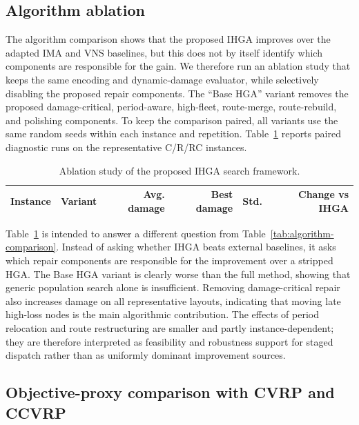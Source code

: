 ﻿\documentclass[preprint,12pt,authoryear]{elsarticle}
\begin{document}
\subsection{Algorithm ablation}
\label{subsec:operator-ablation}

The algorithm comparison shows that the proposed IHGA improves over the adapted IMA and VNS baselines, but this does not by itself identify which components are responsible for the gain. We therefore run an ablation study that keeps the same encoding and dynamic-damage evaluator, while selectively disabling the proposed repair components. The ``Base HGA'' variant removes the proposed damage-critical, period-aware, high-fleet, route-merge, route-rebuild, and polishing components. To keep the comparison paired, all variants use the same random seeds within each instance and repetition. Table~\ref{tab:operator-ablation} reports paired diagnostic runs on the representative C/R/RC instances.

\begin{table}[H]
\centering
\caption{Ablation study of the proposed IHGA search framework.}
\label{tab:operator-ablation}
\scriptsize
\begin{tabular}{llrrrr}
\toprule
Instance & Variant & Avg. damage & Best damage & Std. & Change vs IHGA \\
\midrule

\end{tabular}
\end{table}

Table~\ref{tab:operator-ablation} is intended to answer a different question from Table~\ref{tab:algorithm-comparison}. Instead of asking whether IHGA beats external baselines, it asks which repair components are responsible for the improvement over a stripped HGA. The Base HGA variant is clearly worse than the full method, showing that generic population search alone is insufficient. Removing damage-critical repair also increases damage on all representative layouts, indicating that moving late high-loss nodes is the main algorithmic contribution. The effects of period relocation and route restructuring are smaller and partly instance-dependent; they are therefore interpreted as feasibility and robustness support for staged dispatch rather than as uniformly dominant improvement sources.

\subsection{Objective-proxy comparison with CVRP and CCVRP}
\label{subsec:model-comparison}
\end{document}
